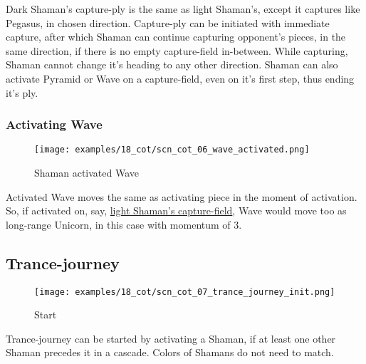 Dark Shaman's capture-ply is the same as light Shaman's, except it captures like
Pegasus, in chosen direction. Capture-ply can be initiated with immediate capture,
after which Shaman can continue capturing opponent's pieces, in the same direction,
if there is no empty capture-field in-between. While capturing, Shaman cannot change
it's heading to any other direction. Shaman can also activate Pyramid or Wave on a
capture-field, even on it's first step, thus ending it's ply.

\clearpage %

\subsubsection*{Activating Wave}

\noindent
\begin{figure}[!h]
\texttt{[image: examples/18\_cot/scn\_cot\_06\_wave\_activated.png]}
\caption{Shaman activated Wave}
\label{fig:scn_cot_06_wave_activated}
\end{figure}

Activated Wave moves the same as activating piece in the moment of activation.
So, if activated on, say,
\hyperref[fig:scn_cot_03_light_shaman_capture_ply]{light Shaman's capture-field},
Wave would move too as long-range Unicorn, in this case with momentum of 3.

\clearpage %

\subsection*{Trance-journey}

\noindent
\begin{wrapfigure}[13]{l}{0.4\textwidth}
\centering
\texttt{[image: examples/18\_cot/scn\_cot\_07\_trance\_journey\_init.png]}
\caption{Start}
\label{fig:scn_cot_07_trance_journey_init}
\end{wrapfigure}
Trance-journey can be started by activating a Shaman, if at least one other
Shaman precedes it in a cascade. Colors of Shamans do not need to match.

